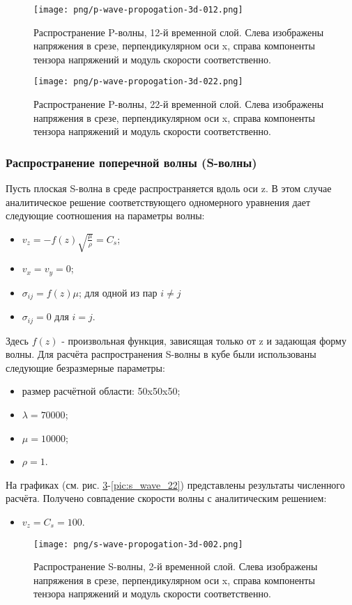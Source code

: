 \begin{figure}[htp]
\centering
\texttt{[image: png/p-wave-propogation-3d-012.png]}
\caption{Распространение P-волны, 12-й временной слой. Слева изображены
напряжения в срезе, перпендикулярном оси x, справа компоненты тензора напряжений
и модуль скорости соответственно.}
\label{pic:p_wave_12}
\end{figure}
\begin{figure}[htp]
\centering
\texttt{[image: png/p-wave-propogation-3d-022.png]}
\caption{Распространение P-волны, 22-й временной слой. Слева изображены
напряжения в срезе, перпендикулярном оси x, справа компоненты тензора напряжений
и модуль скорости соответственно.}
\label{pic:p_wave_22}
\end{figure}
\subsubsection{Распространение поперечной волны (S-волны)}
Пусть плоская S-волна в среде распространяется вдоль оси z. В этом случае аналитическое решение соответствующего одномерного уравнения дает следующие соотношения на параметры волны:
\begin{itemize}
\item $v_z=-f(z)\sqrt{\frac{\mu}{\rho}}=C_s$;
\item $v_x=v_y=0$;
\item $\sigma_{ij}=f(z)\mu$; для одной из пар $i \neq j$
\item $\sigma_{ij}=0$ для $i = j$.
\end{itemize}
Здесь $f(z)$ - произвольная функция, зависящая только от z и задающая форму волны.
Для расчёта распространения S-волны в кубе были использованы следующие безразмерные параметры: 
\begin{itemize}
\item размер расчётной области: 50x50x50;
\item $\lambda=70000$;
\item $\mu=10000$;
\item $\rho=1$.
\end{itemize}
На графиках (см. рис.
\ref{pic:s_wave_2}-\ref{pic:s_wave_22}) представлены результаты численного расчёта. Получено совпадение скорости волны с аналитическим решением:
\begin{itemize}
\item $v_z=C_s=100$.
\end{itemize}
\begin{figure}[htp]
\centering
\texttt{[image: png/s-wave-propogation-3d-002.png]}
\caption{Распространение S-волны, 2-й временной слой. Слева изображены
напряжения в срезе, перпендикулярном оси x, справа компоненты тензора напряжений
и модуль скорости соответственно.}
\label{pic:s_wave_2}
\end{figure}
